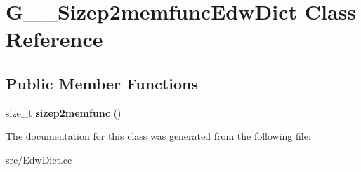 \hypertarget{class_g_____sizep2memfunc_edw_dict}{
\section{G\_\-\_\-Sizep2memfuncEdwDict Class Reference}
\label{class_g_____sizep2memfunc_edw_dict}
}
\subsection*{Public Member Functions}
\begin{DoxyCompactItemize}
\item 
\hypertarget{class_g_____sizep2memfunc_edw_dict_ab8d2d280e23b49c4dcf17a2d5c304e65}{
size\_\-t {\bfseries sizep2memfunc} ()}
\label{class_g_____sizep2memfunc_edw_dict_ab8d2d280e23b49c4dcf17a2d5c304e65}

\end{DoxyCompactItemize}


The documentation for this class was generated from the following file:\begin{DoxyCompactItemize}
\item 
src/EdwDict.cc\end{DoxyCompactItemize}
